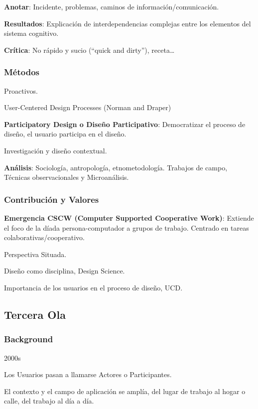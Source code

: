 \documentclass[12pt, twoside, openright]{report} %
\begin{document}
\textbf{Anotar}: Incidente, problemas, caminos de
información/comunicación.

\textbf{Resultados}: Explicación de interdependencias complejas entre
los elementos del sistema cognitivo.

\textbf{Crítica}: No rápido y sucio (``quick and dirty''),
receta\ldots{}

\subsubsection{Métodos}

Proactivos.

User-Centered Design Processes (Norman and Draper)

\textbf{Participatory Design o Diseño Participativo}: Democratizar el
proceso de diseño, el usuario participa en el diseño.

Investigación y diseño contextual.

\textbf{Análisis}: Sociología, antropología, etnometodología. Trabajos
de campo, Técnicas observacionales y Microanálisis.

\subsubsection{Contribución y Valores}

\textbf{Emergencia CSCW (Computer Supported Cooperative Work)}: Extiende
el foco de la díada persona-computador a grupos de trabajo. Centrado en
tareas colaborativas/cooperativo.

Perspectiva Situada.

Diseño como disciplina, Design Science.

Importancia de los usuarios en el proceso de diseño, UCD.

\subsection{Tercera Ola}


\subsubsection{Background}

2000s

Los Usuarios pasan a llamarse Actores o Participantes.

El contexto y el campo de aplicación se amplía, del lugar de trabajo al
hogar o calle, del trabajo al día a día.
\end{document}
